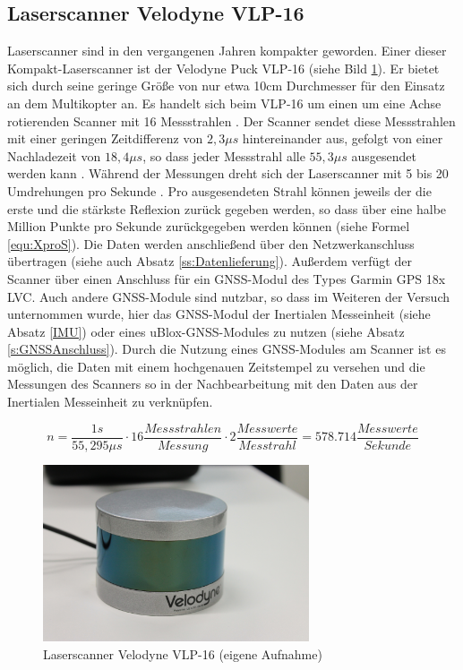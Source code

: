 \documentclass[a4paper,12pt,bibliography=totoc, listof=totoc,titlepage]{scrreprt}
\begin{document}
\subsection{Laserscanner Velodyne VLP-16}
Laserscanner sind in den vergangenen Jahren kompakter geworden. Einer dieser Kompakt-Laserscanner ist der Velodyne Puck VLP-16 (siehe Bild \ref{img:vlp16}). Er bietet sich durch seine geringe Größe von nur etwa 10cm Durchmesser für den Einsatz an dem Multikopter an. Es handelt sich beim VLP-16 um einen um eine Achse rotierenden Scanner mit 16 Messstrahlen \citep{vlpSheet}. Der Scanner sendet diese Messstrahlen mit einer geringen Zeitdifferenz von \(2,3\mu s\) hintereinander aus, gefolgt von einer Nachladezeit von \(18,4\mu s\), so dass jeder Messstrahl alle \(55,3\mu s\) ausgesendet werden kann \citep[S. 16]{vlpManual}. Während der Messungen dreht sich der Laserscanner mit 5 bis 20 Umdrehungen pro Sekunde \citep{vlpSheet}. Pro ausgesendeten Strahl können jeweils der die erste und die stärkste Reflexion zurück gegeben werden, so dass über eine halbe Million Punkte pro Sekunde zurückgegeben werden können (siehe Formel \ref{equ:XproS}). Die Daten werden anschließend über den Netzwerkanschluss übertragen (siehe auch Absatz \ref{ss:Datenlieferung}). Außerdem verfügt der Scanner über einen Anschluss für ein GNSS-Modul des Types Garmin GPS 18x LVC. Auch andere GNSS-Module sind nutzbar, so dass im Weiteren der Versuch unternommen wurde, hier das GNSS-Modul der Inertialen Messeinheit (siehe Absatz \ref{IMU}) oder eines uBlox-GNSS-Modules zu nutzen (siehe Absatz \ref{s:GNSSAnschluss}). Durch die Nutzung eines GNSS-Modules am Scanner ist es möglich, die Daten mit einem hochgenauen Zeitstempel zu versehen und die Messungen des Scanners so in der Nachbearbeitung mit den Daten aus der Inertialen Messeinheit zu verknüpfen.

\begin{equation}
 \label{equ:XproS}
 n = \frac{1s}{55,295\mu s} \cdot 16  \frac{Messstrahlen}{Messung} \cdot 2  \frac{Messwerte}{Messtrahl} = 578.714 \frac{Messwerte}{Sekunde}
\end{equation}

\begin{figure}[ht!]
 \centering
 \includegraphics[width=0.7\textwidth]{./img/vlp16.jpg}
 \caption{Laserscanner Velodyne VLP-16 (eigene Aufnahme)}
 \label{img:vlp16}
\end{figure}
\end{document}
